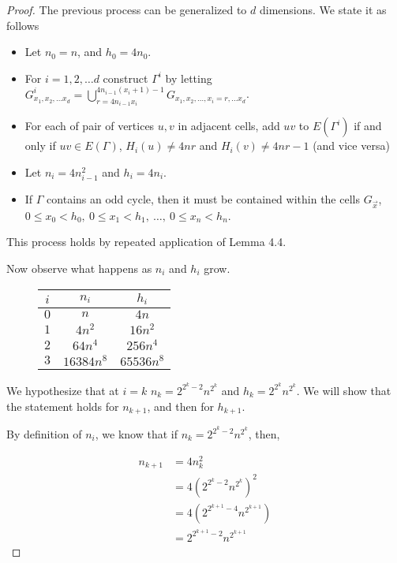 \documentclass[letterpaper]{article}
\begin{document}
\begin{proof}
The previous process can be generalized to $d$ dimensions.
We state it as follows

\begin{itemize}
\item Let $n_0 = n$, and $h_0 = 4n_0$.
\item For $i = 1, 2, \ldots d$ construct $\Gamma^i$ by letting $G^i_{x_1, x_2, \ldots x_d} = \bigcup_{r = 4n_{i-1}x_i}^{4n_{i-1}(x_i+1)-1} G_{x_1, x_2, \ldots, x_i = r, \ldots x_d}$.
\item For each of pair of vertices $u,v$ in adjacent cells, add $uv$ to $E(\Gamma^i)$ if and only if $uv \in E(\Gamma)$, $H_i(u) \neq 4nr$ and $H_i(v) \neq 4nr-1$ (and vice versa)
\item Let $n_i = 4n_{i-1}^2$ and $h_i = 4n_i$.
\item If $\Gamma$ contains an odd cycle, then it must be contained within the cells $G_{\vec{x}}$, $0 \leq x_0 < h_0, \ 0 \leq x_1 < h_1, \ \ldots, \ 0 \leq x_n < h_n$. 
\end{itemize}

This process holds by repeated application of Lemma 4.4.

Now observe what happens as $n_i$ and $h_i$ grow.

\begin{figure}[H]
\centering
\begin{tabular}{c|c|c}
$i$ & $n_i$ & $h_i$ \\ \hline
$0$ & $n$ & $4n$ \\
$1$ & $4n^2$ & $16n^2$ \\
$2$ & $64n^4$ & $256n^4$ \\
$3$ & $16384n^8$ & $65536n^8$ \\
\end{tabular}
\end{figure}

We hypothesize that at $i = k$ $n_k = 2^{2^{k}-2} n^{2^k}$ and $h_k = 2^{2^{k}} n^{2^{k}}$. 
We will show that the statement holds for $n_{k+1}$, and then for $h_{k+1}$.

By definition of $n_i$, we know that if $n_k = 2^{2^{k}-2} n^{2^k}$, then,

\begin{align*}
n_{k+1} &= 4n_k^2 \\
&= 4(2^{2^k-2} n^{2^k})^2 \\
&= 4(2^{2^{k+1} - 4} n^{2^{k+1}}) \\
&= 2^{2^{k+1} - 2} n^{2^{k+1}}
\end{align*}


\end{proof}
\end{document}
